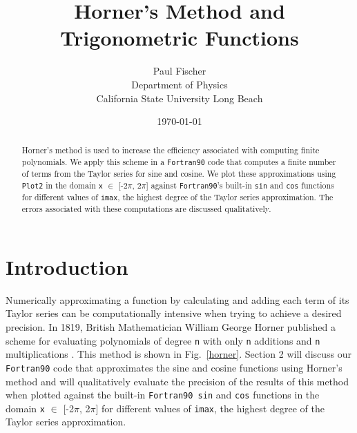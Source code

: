 \documentclass[12pt]{article}
\begin{document}

\title{Horner's Method and Trigonometric Functions}
\author{Paul Fischer \\
Department of Physics\\
California State University Long Beach}
\date{\today }

\maketitle

\begin{abstract}

Horner's method is used to increase the efficiency associated with computing finite polynomials. We apply this scheme in a {\tt Fortran90} code that computes a finite number of terms from the Taylor series for sine and cosine. We plot these approximations using {\tt Plot2} in the domain {\tt x} $\in$ [-2$\pi$, 2$\pi$] against {\tt Fortran90}'s built-in {\tt sin} and {\tt cos} functions for different values of {\tt imax}, the highest degree of the Taylor series approximation. The errors associated with these computations are discussed qualitatively.

\end{abstract}

\section{Introduction}

Numerically approximating a function by calculating and adding each term of its Taylor series can be computationally intensive when trying to achieve a desired precision.  In 1819, British Mathematician William George Horner published a scheme for evaluating polynomials of degree {\tt n} with only {\tt n} additions and {\tt n} multiplications \cite{wiki}. This method is shown in Fig.\ \ref{horner}.  Section 2 will discuss our {\tt Fortran90} code that approximates the sine and cosine functions using Horner's method and will qualitatively evaluate the precision of the results of this method when plotted against the built-in {\tt Fortran90 sin} and {\tt cos} functions in the domain {\tt x} $\in$ [-2$\pi$, 2$\pi$] for different values of {\tt imax}, the highest degree of the Taylor series approximation. 
\end{document}
